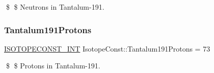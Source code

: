 \$ \$ Neutrons in Tantalum-\/191. \mbox{\label{group___isotope_const-_tantalum-_ta191_ga5b207df2faa04c3f1cf7712a1df696a8}} 
\subsubsection{\texorpdfstring{Tantalum191\+Protons}{Tantalum191Protons}}
{\footnotesize\ttfamily \mbox{\hyperlink{group___isotope_const-_macros_ga5f18360b3e99483a35c32d789e62621c}{I\+S\+O\+T\+O\+P\+E\+C\+O\+N\+S\+T\+\_\+\+I\+NT}} Isotope\+Const\+::\+Tantalum191\+Protons = 73}

\$ \$ Protons in Tantalum-\/191. 